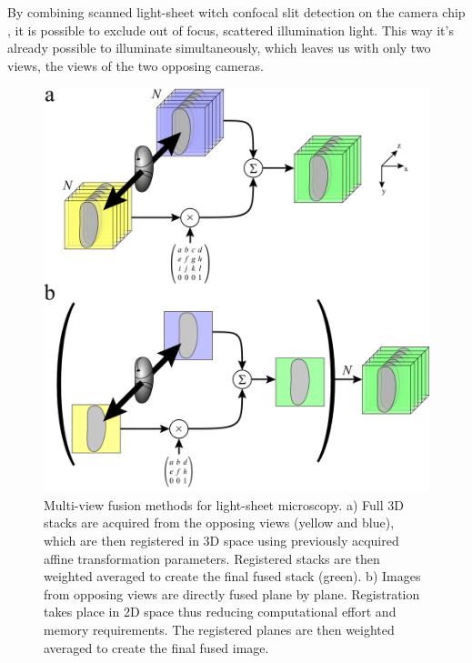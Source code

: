 By combining scanned light-sheet \cite{keller_reconstruction_2008} witch confocal slit detection on the camera chip \cite{baumgart_scanned_2012}, it is possible to exclude out of focus, scattered illumination light. This way it's already possible to illuminate simultaneously, which leaves us with only two views, the views of the two opposing cameras.

\begin{figure}[bt]
\centering
\includegraphics[width=0.5\columnwidth]{fusion/acquisition}
\caption{Multi-view fusion methods for light-sheet microscopy. a) Full 3D stacks are acquired from the opposing views (yellow and blue), which are then registered in 3D space using previously acquired affine transformation parameters. Registered stacks are then weighted averaged to create the final fused stack (green). b) Images from opposing views are directly fused plane by plane. Registration takes place in 2D space thus reducing computational effort and memory requirements. The registered planes are then weighted averaged to create the final fused image.}
\label{fig:acquisition}
\end{figure}

